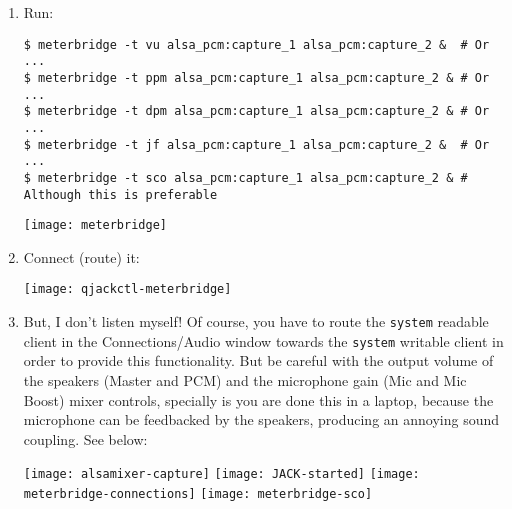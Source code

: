 \begin{enumerate}
\item Run:
\begin{verbatim}
$ meterbridge -t vu alsa_pcm:capture_1 alsa_pcm:capture_2 &  # Or ...
$ meterbridge -t ppm alsa_pcm:capture_1 alsa_pcm:capture_2 & # Or ...
$ meterbridge -t dpm alsa_pcm:capture_1 alsa_pcm:capture_2 & # Or ...
$ meterbridge -t jf alsa_pcm:capture_1 alsa_pcm:capture_2 &  # Or ...
$ meterbridge -t sco alsa_pcm:capture_1 alsa_pcm:capture_2 & # Although this is preferable
\end{verbatim}
\begin{center}
  \texttt{[image: meterbridge]}
\end{center}
\item Connect (route) it:
\begin{center}
  \texttt{[image: qjackctl-meterbridge]}
\end{center}

\item But, I don't listen myself! Of course, you have to route the
  \texttt{system} readable client in the Connections/Audio window
  towards the \texttt{system} writable client in order to provide this
  functionality. But be careful with the output volume of the speakers
  (Master and PCM) and the microphone gain (Mic and Mic Boost) mixer
  controls, specially is you are done this in a laptop, because the
  microphone can be feedbacked by the speakers, producing an annoying
  sound coupling. See below:

  \begin{center}
    \texttt{[image: alsamixer-capture]}
    \texttt{[image: JACK-started]}
    \texttt{[image: meterbridge-connections]}
    \texttt{[image: meterbridge-sco]}
  \end{center}
  
\end{enumerate}





